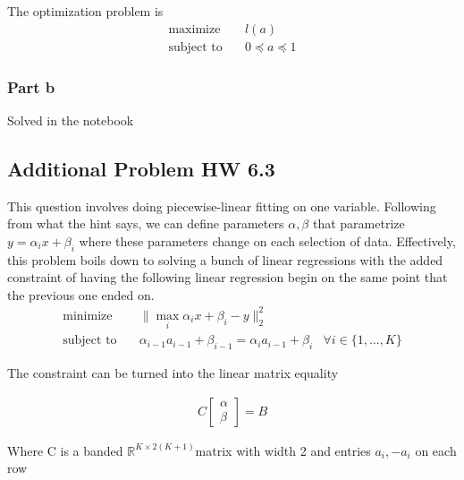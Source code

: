 The optimization problem is
\begin{align}
  \text{maximize} & \quad l(a) \\
  \text{subject to} & \quad  0 \preceq a \preceq 1
\end{align}

\subsubsection{Part b}
Solved in the notebook

\subsection{Additional Problem HW 6.3}
This question involves doing piecewise-linear fitting on one variable. Following from what the hint says, we can define parameters $\alpha, \beta$ that parametrize $y = \alpha_i x + \beta_i $ where these parameters change on each selection of data. Effectively, this problem boils down to solving a bunch of linear regressions with the added constraint of having the following linear regression begin on the same point that the previous one ended on. 
\begin{align}
  \text{minimize} & \quad \| \max_i \alpha_i x + \beta_i -y \|_2^2 \\
  \text{subject to} & \quad \alpha_{i-1} a_{i-1} + \beta_{i-1} = \alpha_{i} a_{i-1} + \beta_{i} & \forall i \in \{ 1, \dots, K \}
\end{align}

The constraint can be turned into the linear matrix equality 

\begin{align}
  C
  \begin{bmatrix}
    \alpha \\
    \beta    
  \end{bmatrix}
  = B
\end{align}

Where C is a banded $\mathbb{R}^{K \times 2 (K+1)}$matrix  with width 2 and entries $a_i, -a_i$ on each row